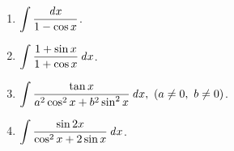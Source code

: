 \documentclass[a4paper,punct=CCT]{ctexbook}
\theoremstyle{break}
\newif\ifshowsol
\begin{document}
\begin{enumerate}
\item \(\displaystyle \int \frac{\mathop{}\!\mathit{d} x}{1 - \cos x}\).

  \ifshowsol
  同样用\(t = \tan\frac{x}{2}\)做换元, 有
  \[
    \begin{split}
      \int \frac{dx}{1-\cos x}
      = \int \frac{1}{\scriptstyle 1-\tfrac{1-t^2}{1+t^2}} \frac{2}{1+t^2} \dt
      = \int \frac{dt}{t^2}
      = - \frac1t + C
      = - \cot\frac{x}{2} + C.
    \end{split}
  \]
  \fi

\item \(\displaystyle \int \frac{1 + \sin x}{1 + \cos x} \mathop{}\!\mathit{d} x\).

  \ifshowsol
  同样用\(t = \tan\frac{x}{2}\)做换元, 有
  \[
    \begin{split}
      \int \frac{1 + \sin x}{1 + \cos x} \dx
      &= \int \tfrac{1 + \tfrac{2t}{1+t^2}}{1+\tfrac{1-t^2}{1+t^2}} \frac{2}{1+t^2} \dt
      = \int \paren[\Big]{1 + \frac{2t}{1+t^2}} \dt \\
      &= t + \ln\paren{1+t^2} + C
      = \tan\frac{x}{2} + \ln\sec^2\frac{x}{2} + C \\
      &= \tan\frac{x}{2} + \ln\frac{2}{1 + \cos x} + C
      = \tan\frac{x}{2} - \ln\paren{1 + \cos x} + C.
    \end{split}
  \]
  \fi

\item \(\displaystyle \int \frac{\tan x}{a^2 \cos^2 x + b^2 \sin^2 x} \mathop{}\!\mathit{d} x,\ (a \ne 0,\ b \ne 0)\).

  \ifshowsol
  用\(u = \tan x\)做换元, 有
  \[
    \begin{split}
      \int \frac{\tan x}{a^2 \cos^2 x + b^2 \sin^2 x} \dx
      &= \int \frac{\tan x}{a^2 + b^2 \tan^2 x} \frac{1}{\cos^2 x} \dx
      = \int \frac{u}{a^2 + b^2 u^2} \du \\
      &= \frac1{2b^2} \ln\paren{a^2 + b^2 u^2} + C
      = \frac1{2b^2} \ln\paren{a^2 + b^2 \tan^2 x} + C.
    \end{split}
  \]
  \fi

\item \(\displaystyle \int \frac{\sin 2x}{\cos^2 x + 2 \sin x} \mathop{}\!\mathit{d} x\).


\end{enumerate}
\end{document}
